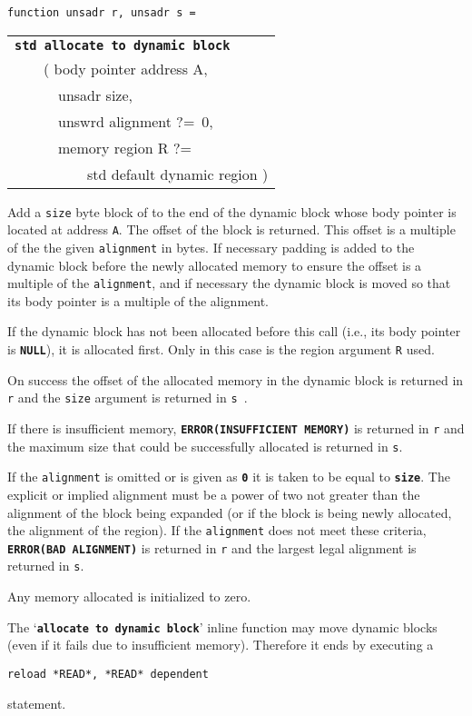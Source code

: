 \documentclass[12pt]{article}
\makeatletter
\newcommand{\TT}[1]{{\tt \bfseries #1}}
\newcommand{\ttstdlkey}[2]{\TT{std #1 #2}\index{#1@{\tt std #1}!#2@{\tt #2}}}
\newcommand{\EOL}{\penalty \exhyphenpenalty}
\newenvironment{indpar}[1][0.3in]%
	{\begin{list}{}%
		     {\setlength{\itemsep}{0in}%
		      \setlength{\topsep}{0in}%
		      \setlength{\parsep}{1ex}%
		      \setlength{\labelwidth}{#1}%
		      \setlength{\leftmargin}{#1}%
		      \addtolength{\leftmargin}{\labelsep}}%
	 \item}%
	{\end{list}}
\makeatother
\begin{document}
\begin{indpar}

{\tt function unsadr r, unsadr s = \\
\hspace*{1in}\begin{tabular}[t]{@{}l@{}}
	     \ttstdlkey{allocate}{to dynamic block}%
		 \label{ALLOCATE-TO-DYNAMIC-BLOCK} \\
	     ~~~~( body pointer address A, \\
	     ~~~~~~unsadr size, \\
	     ~~~~~~unswrd alignment ?=~0, \\
	     ~~~~~~memory region R ?= \\
	     ~~~~~~~~~~std default dynamic region ) \\
	     \end{tabular}}

\begin{indpar}
Add a {\tt size} byte block of to the end of the
dynamic block whose body pointer
is located at address {\tt A}.  The offset of the block is returned.
This offset is a multiple of the the given {\tt alignment} in bytes.
If necessary padding is added to the dynamic block before the
newly allocated memory to ensure the offset is a multiple of the
{\tt alignment}, and if necessary the dynamic block is moved so that
its body pointer is a multiple of the alignment.

If the dynamic block has not been allocated before this call
(i.e., its body pointer is \TT{NULL}),
it is allocated first.  Only in this case is the region argument {\tt R}
used.

On success the offset of the allocated memory in the dynamic block
is returned in {\tt r} and
the {\tt size} argument is returned in {\tt s }.

If there is insufficient memory,
\TT{ERROR(\EOL INSUFFICIENT MEMORY)} is returned in {\tt r} and
the maximum size that could be successfully allocated is returned in {\tt s}.

If the {\tt alignment} is omitted or is given as \TT{0} it is taken
to be equal to \TT{size}.  The explicit or implied
alignment must be a power of two not greater than the alignment of the
block being expanded (or if the block is being newly allocated, the
alignment of the region).  If the {\tt alignment}
does not meet these criteria,
\TT{ERROR(BAD ALIGNMENT)} is returned in {\tt r}
and the largest legal alignment is returned in {\tt s}.

Any memory allocated is initialized to zero.

The `\TT{allocate to dynamic block}' inline function may move dynamic blocks
(even if it fails due to insufficient memory).
Therefore it ends by executing a
\begin{center}
{\tt reload *READ*, *READ* dependent}
\end{center}
statement.

\end{indpar}

\end{indpar}
\end{document}
